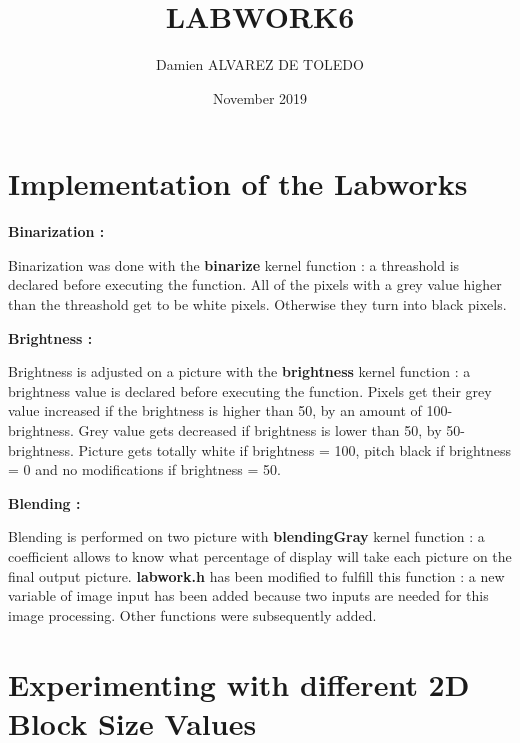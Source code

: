 \documentclass{article}
\title{LABWORK6}
\author{Damien ALVAREZ DE TOLEDO }
\date{November 2019}
\begin{document}
\maketitle

\section{Implementation of the Labworks}


\textbf{Binarization :}\newline

Binarization was done with the \textbf{binarize} kernel function : a threashold is declared before executing the function.\newline
All of the pixels with a grey value higher than the threashold get to be white pixels. Otherwise they turn into black pixels.\newline
\newline

\textbf{Brightness :}\newline

Brightness is adjusted on a picture with the \textbf{brightness} kernel function : a brightness value is declared before executing the function. \newline
Pixels get their grey value increased if the brightness is higher than 50, by an amount of 100-brightness. Grey value gets decreased if brightness is lower than 50, by 50-brightness. Picture gets totally white if brightness = 100, pitch black if brightness = 0 and no modifications if brightness = 50.
\newline

\textbf{Blending :}\newline

Blending is performed on two picture with \textbf{blendingGray} kernel function : a coefficient allows to know what percentage of display will take each picture on the final output picture.\newline
\textbf{labwork.h} has been modified to fulfill this function : a new variable of image input has been added because two inputs are needed for this image processing. Other functions were subsequently added. \newline
\newline

\section{Experimenting with different 2D Block Size Values}
\end{document}
